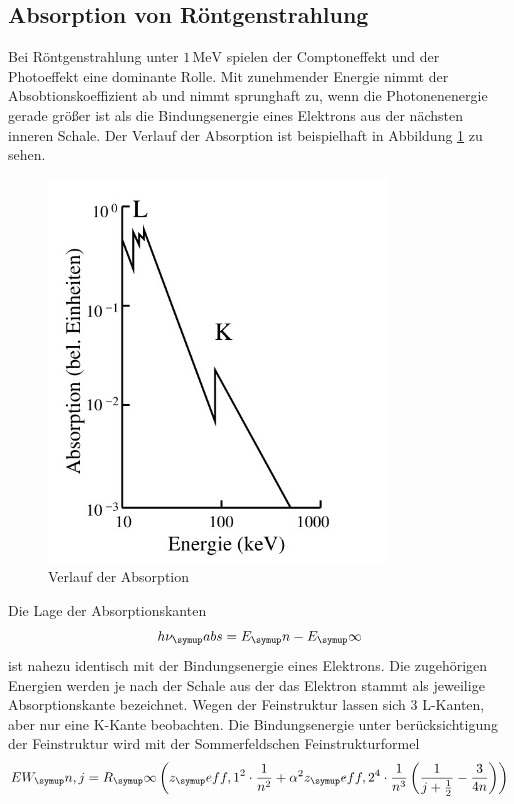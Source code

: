 \subsection{Absorption von Röntgenstrahlung}
Bei Röntgenstrahlung unter $1 \,\si{\mega\electronvolt}$ spielen der Comptoneffekt
und der Photoeffekt eine dominante Rolle.
Mit zunehmender Energie nimmt der Absobtionskoeffizient ab und nimmt
sprunghaft zu, wenn die Photonenenergie gerade größer ist als die Bindungsenergie
eines Elektrons aus der nächsten inneren Schale.
Der Verlauf der Absorption ist beispielhaft in Abbildung \ref{fig:absorb} zu sehen.
\begin{figure}
  \centering
  \includegraphics[width=0.8\textwidth]{bilder/absorb.pdf}
  \caption{Verlauf der Absorption\cite{V602}}
  \label{fig:absorb}
\end{figure}
Die Lage der Absorptionskanten
\begin{equation*}
  h\nu_\su{abs} = E_\su{n} - E_\su{\infty}
\end{equation*}
ist nahezu identisch mit der Bindungsenergie eines Elektrons. Die zugehörigen
Energien werden je nach der Schale aus der das Elektron stammt als jeweilige
Absorptionskante bezeichnet. %
Wegen der Feinstruktur lassen sich 3 L-Kanten, aber nur eine K-Kante beobachten.
Die Bindungsenergie unter berücksichtigung der Feinstruktur wird mit der
Sommerfeldschen Feinstrukturformel
\begin{equation}
  EW_\su{n, j}=R_\su{\infty}\left(z_\su{eff,1}^2\cdot\frac{1}{n^2}
  +\alpha^2 z_\su{eff,2}^4\cdot\frac{1}{n^3}\left(\frac{1}{j+\frac{1}{2}}-
  \frac{3}{4n}\right)\right)
  \label{sommerfeld}
\end{equation}
